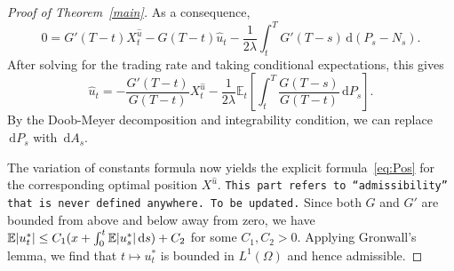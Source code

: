 \documentclass[11pt]{article}
\theoremstyle{definition}
\theoremstyle{remark}
\newcommand{\E}{\mathbb{E}} %
\DeclarePairedDelimiter{\abs}{\lvert}{\rvert} %
\newcommand{\ts}{\textstyle}
\newcommand{\de}{\,\mathrm{d}}
\begin{document}
\begin{proof}[Proof of Theorem~\ref{main}]
As a consequence,
$$
0=G'(T-t)X^{\hat{u}}_t-G(T-t)\hat{u}_t-\frac{1}{2\lambda}\int_t^T G'(T-s) \de (P_s-N_s).
$$
After solving for the trading rate and taking conditional expectations, this gives
$$
\hat{u}_t = -\frac{G'(T-t)}{G(T-t)} X^{\hat{u}}_t - \frac{1}{2\lambda} \E_t\left[\int_t^T\frac{G(T-s)}{G(T-t)} \de P_s\right].
$$
By the Doob-Meyer decomposition and integrability condition, we can replace $\de P_s$ with $\de A_s$.

The variation of constants formula now yields the explicit formula~\eqref{eq:Pos} for the corresponding optimal position $X^{\hat{u}}$.
\texttt{This part refers to ``admissibility'' that is never defined anywhere. To be updated.}
Since both $G$ and $G'$ are bounded from above and below away from zero, we have $\E\abs{u^\ast_t} \le C_1 (x+\int_0^t \E\abs{u^\ast_s} \de s) + C_2$ for some $C_1, C_2 > 0$. Applying Gronwall's lemma, we find that $t\mapsto u^\ast_t$ is bounded in $L^1(\Omega)$ and hence admissible.



\end{proof}
\end{document}
